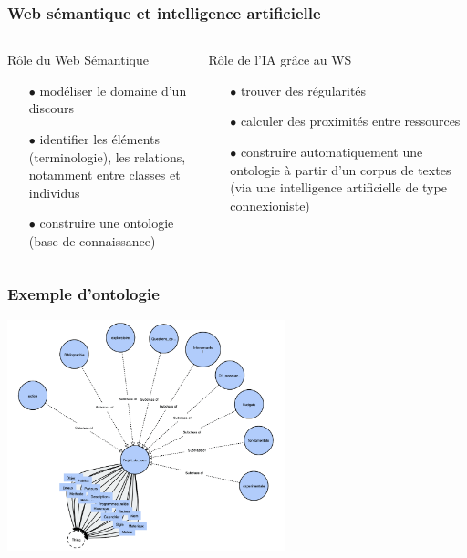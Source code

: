 \documentclass[xcolor=dvipsnames]{beamer}
\begin{document}
\begin{frame}[fragile]
\frametitle{Web sémantique et intelligence artificielle}
\begin{columns}
	\begin{block}{Rôle du Web Sémantique}
		\begin{itemize}
			\item[$\bullet$]modéliser le domaine d'un discours
			\item[$\bullet$]identifier les éléments (terminologie), les relations, notamment entre classes et individus
			\item[$\bullet$] construire une ontologie (base de connaissance)
		\end{itemize}
	\end{block}
	\begin{block}{Rôle de l'IA grâce au WS}
		\begin{itemize}
			\item[$\bullet$]trouver des régularités
			\item[$\bullet$]calculer des proximités entre ressources
			\item[$\bullet$]construire automatiquement une ontologie à partir d'un corpus de textes (via une intelligence artificielle de type connexioniste)
		\end{itemize}
	\end{block}
\end{columns}
\end{frame}

\begin{frame}[fragile]
\frametitle{Exemple d'ontologie}
\includegraphics[height = 6.7cm]{images/Ontologie_2.png}
\end{frame}
\end{document}
